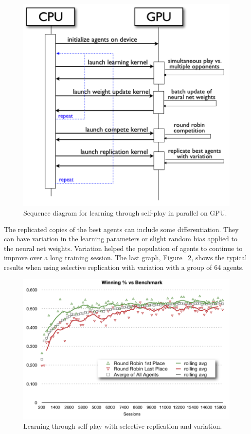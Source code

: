 \begin{figure}[hbtp]
\center
\includegraphics[scale=0.8]{fig19}
\caption{Sequence diagram for learning through self-play in parallel on GPU.}
\label{fig:seq_diag_self_play}
\end{figure}
\begin{flushleft}

The replicated copies of the best agents can include some differentiation.  They can have variation in the learning parameters or slight random bias applied to the neural net weights.  Variation helped the population of agents to continue to improve over a long training session.  The last graph, Figure ~\ref{fig:selection}, shows the typical results when using selective replication with variation with a group of 64 agents.  

\end{flushleft}
\begin{figure}[hbtp]
\center
\includegraphics[scale=0.8]{fig20}
\caption{Learning through self-play with selective replication and variation.}
\label{fig:selection}
\end{figure}

